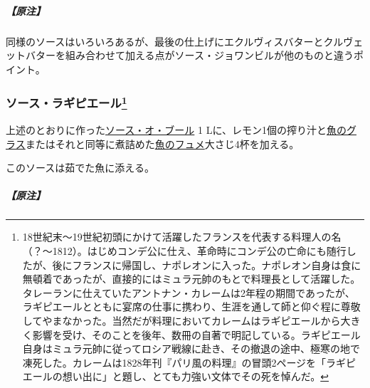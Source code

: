 \begin{recette}
\hypertarget{nota-sauce-joinville}{%
\subparagraph{【原注】}\label{nota-sauce-joinville}}

同様のソースはいろいろあるが、最後の仕上げにエクルヴィスバターとクルヴェットバターを組み合わせて加える点がソース・ジョワンビルが他のものと違うポイント。

\atoaki{}

\hypertarget{sauce-laguipiere}{%
\subsubsection[ソース・ラギピエール]{\texorpdfstring{ソース・ラギピエール\footnote{18世紀末〜19世紀初頭にかけて活躍したフランスを代表する料理人の名（？〜1812）。はじめコンデ公に仕え、革命時にコンデ公の亡命にも随行したが、後にフランスに帰国し、ナポレオンに入った。ナポレオン自身は食に無頓着であったが、直接的にはミュラ元帥のもとで料理長として活躍した。タレーランに仕えていたアントナン・カレームは2年程の期間であったが、ラギピエールとともに宴席の仕事に携わり、生涯を通して師と仰ぐ程に尊敬してやまなかった。当然だが料理においてカレームはラギピエールから大きく影響を受け、そのことを後年、数冊の自著で明記している。ラギピエール自身はミュラ元帥に従ってロシア戦線に赴き、その撤退の途中、極寒の地で凍死した。カレームは1828年刊『パリ風の料理』の冒頭2ページを「ラギピエールの想い出に」と題し、とても力強い文体でその死を悼んだ。}}{ソース・ラギピエール}}\label{sauce-laguipiere}}



上述のとおりに作った\protect\hyperlink{sauce-au-beurre}{ソース・オ・ブール}
1
Lに、レモン1個の搾り汁と\protect\hyperlink{glace-de-poisson}{魚のグラス}またはそれと同等に煮詰めた\protect\hyperlink{fumet-de-poisson}{魚のフュメ}大さじ4杯を加える。

このソースは茹でた魚に添える。

\hypertarget{nota-sauce-laguipiere}{%
\subparagraph{【原注】}\label{nota-sauce-laguipiere}}


\end{recette}
